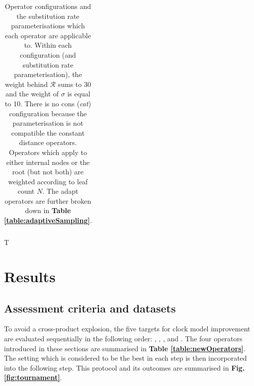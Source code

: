 \documentclass[10pt,letterpaper]{article}
\begin{document}
\begin{table}[h!]
\begin{tabular}{|l l l l l l|}
  \hline

\end{tabular}
\caption{Operator configurations and the substitution rate parameterisations which each operator are applicable to. Within each configuration (and substitution rate parameterisation), the weight behind $\mathcal{R}$ sums to 30 and the weight of $\sigma$ is equal to 10. 
There is no cons (\textit{cat}) configuration because the parameterisation is not compatible the constant distance operators.
Operators which apply to either internal nodes or the root (but not both) are weighted according to leaf count $N$. The adapt operators are further broken down in \textbf{Table \ref{table:adaptiveSampling}}.} 
T%
\label{table:operatorSchemes}
\end{table}





\clearpage
\section*{Results} \label{sect:results}





\subsection*{Assessment criteria and datasets}








To avoid a cross-product explosion, the five targets for clock model improvement are evaluated sequentially in the following order: \textbf{} \textbf{}, \textbf{}, \textbf{}, and \textbf{}.
The four operators introduced in these sections are summarised in \textbf{Table \ref{table:newOperators}}.
The setting which is considered to be the best in each step is then incorporated into the following step. This protocol and its outcomes are summarised in \textbf{Fig. \ref{fig:tournament}}.
\end{document}
